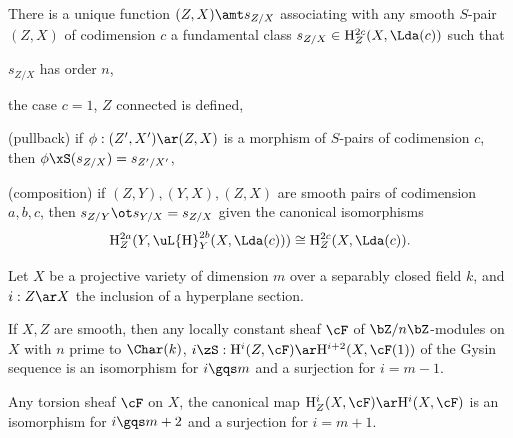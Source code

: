 \documentclass[a4paper, twoside]{article}
\begin{document}
\begin{thm}
    There is a unique function $(Z,X)\amt s_{Z/X}$ associating with any smooth $S$-pair $(Z,X)$ of codimension $c$ a fundamental class $s_{Z/X}\in \mathrm{H}_{Z}^{2c}(X, \Lda(c))$ such that
    \begin{enr}
        \item $s_{Z/X}$ has order $n$,
        \item the case $c=1$, $Z$ connected is defined,
        \item (pullback) if $\phi:(Z',X')\ar(Z,X)$ is a morphism of $S$-pairs of codimension $c$, then $\phi\xS(s_{Z/X})=s_{Z'/X'}$,
        \item (composition) if $(Z,Y), (Y,X), (Z,X)$ are smooth pairs of codimension $a,b,c$, then $s_{Z/Y}\ot s_{Y/X}=s_{Z/X}$ given the canonical isomorphisms
        \[
            \mathrm{H}_{Z}^{2a}(Y, \mathrm{\uL{H}}_{Y}^{2b}(X,\Lda(c)))\cong \mathrm{H}_{Z}^{2c}(X, \Lda(c)).
        \]
  \end{enr}
\end{thm}

\begin{thm}
    Let $X$ be a projective variety of dimension $m$ over a separably closed field $k$, and $i:Z\ar X$ the inclusion of a hyperplane section.
    \begin{enr}
        \item If $X,Z$ are smooth, then any locally constant sheaf $\cF$ of $\bZ/n\bZ$-modules on $X$ with $n$ prime to $\Char(k)$, $i\zS:\mathrm{H}_{}^{i}(Z,\cF)\ar \mathrm{H}_{}^{i+2}(X,\cF(1))$ of the Gysin sequence is an isomorphism for $i\gqs m$ and a surjection for $i=m-1$.
        \item Any torsion sheaf $\cF$ on $X$, the canonical map $\mathrm{H}_{Z}^{i}(X,\cF)\ar \mathrm{H}_{}^{i}(X,\cF)$ is an isomorphism for $i\gqs m+2$ and a surjection for $i=m+1$.
    \end{enr}
\end{thm}
\end{document}
